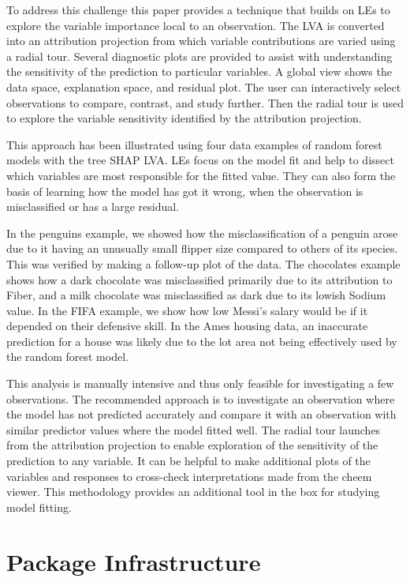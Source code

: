 \documentclass[
]{article}
\begin{document}
To address this challenge this paper provides a technique that builds on LEs to explore the variable importance local to an observation. The LVA is converted into an attribution projection from which variable contributions are varied using a radial tour. Several diagnostic plots are provided to assist with understanding the sensitivity of the prediction to particular variables. A global view shows the data space, explanation space, and residual plot. The user can interactively select observations to compare, contrast, and study further. Then the radial tour is used to explore the variable sensitivity identified by the attribution projection.

This approach has been illustrated using four data examples of random forest models with the tree SHAP LVA. LEs focus on the model fit and help to dissect which variables are most responsible for the fitted value. They can also form the basis of learning how the model has got it wrong, when the observation is misclassified or has a large residual.

In the penguins example, we showed how the misclassification of a penguin arose due to it having an unusually small flipper size compared to others of its species. This was verified by making a follow-up plot of the data. The chocolates example shows how a dark chocolate was misclassified primarily due to its attribution to Fiber, and a milk chocolate was misclassified as dark due to its lowish Sodium value. In the FIFA example, we show how low Messi's salary would be if it depended on their defensive skill. In the Ames housing data, an inaccurate prediction for a house was likely due to the lot area not being effectively used by the random forest model.

This analysis is manually intensive and thus only feasible for investigating a few observations. The recommended approach is to investigate an observation where the model has not predicted accurately and compare it with an observation with similar predictor values where the model fitted well. The radial tour launches from the attribution projection to enable exploration of the sensitivity of the prediction to any variable. It can be helpful to make additional plots of the variables and responses to cross-check interpretations made from the cheem viewer. This methodology provides an additional tool in the box for studying model fitting.

\hypertarget{sec:infrastructure}{%
\section{Package Infrastructure}\label{sec:infrastructure}}
\end{document}
